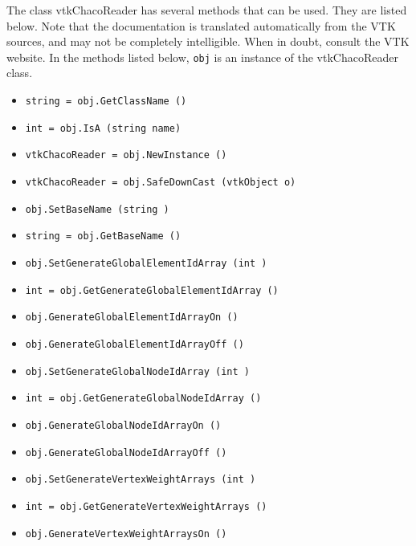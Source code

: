 The class vtkChacoReader has several methods that can be used.
  They are listed below.
Note that the documentation is translated automatically from the VTK sources,
and may not be completely intelligible.  When in doubt, consult the VTK website.
In the methods listed below, \verb|obj| is an instance of the vtkChacoReader class.
\begin{itemize}
\item  \verb|string = obj.GetClassName ()|

\item  \verb|int = obj.IsA (string name)|

\item  \verb|vtkChacoReader = obj.NewInstance ()|

\item  \verb|vtkChacoReader = obj.SafeDownCast (vtkObject o)|

\item  \verb|obj.SetBaseName (string )|

\item  \verb|string = obj.GetBaseName ()|

\item  \verb|obj.SetGenerateGlobalElementIdArray (int )|

\item  \verb|int = obj.GetGenerateGlobalElementIdArray ()|

\item  \verb|obj.GenerateGlobalElementIdArrayOn ()|

\item  \verb|obj.GenerateGlobalElementIdArrayOff ()|

\item  \verb|obj.SetGenerateGlobalNodeIdArray (int )|

\item  \verb|int = obj.GetGenerateGlobalNodeIdArray ()|

\item  \verb|obj.GenerateGlobalNodeIdArrayOn ()|

\item  \verb|obj.GenerateGlobalNodeIdArrayOff ()|

\item  \verb|obj.SetGenerateVertexWeightArrays (int )|

\item  \verb|int = obj.GetGenerateVertexWeightArrays ()|

\item  \verb|obj.GenerateVertexWeightArraysOn ()|


\end{itemize}
